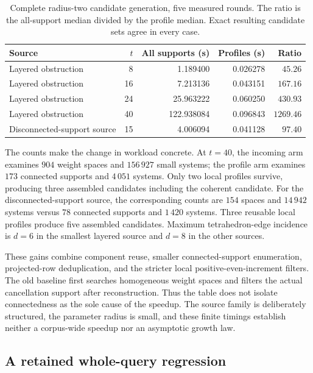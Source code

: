 \begin{table}[htbp]
\centering
\small
\begin{tabular}{lrrrr}
\hline
Source & $t$ & All supports (s) & Profiles (s) & Ratio\\
\hline
Layered obstruction & 8 & 1.189400 & 0.026278 & $45.26$\\
Layered obstruction & 16 & 7.213136 & 0.043151 & $167.16$\\
Layered obstruction & 24 & 25.963222 & 0.060250 & $430.93$\\
Layered obstruction & 40 & 122.938084 & 0.096843 & $1269.46$\\
Disconnected-support source & 15 & 4.006094 & 0.041128 & $97.40$\\
\hline
\end{tabular}
\caption{Complete radius-two candidate generation, five measured
rounds.  The ratio is the all-support median divided by the profile
median.  Exact resulting candidate sets agree in every case.}
\label{tab:profile-radius-two}
\end{table}

The counts make the change in workload concrete.  At $t=40$, the
incoming arm examines $904$ weight spaces and $156\,927$ small systems;
the profile arm examines $173$ connected supports and $4\,051$ systems.
Only two local profiles survive, producing three assembled candidates
including the coherent candidate.  For the disconnected-support source,
the corresponding counts are $154$ spaces and $14\,942$ systems versus
$78$ connected supports and $1\,420$ systems.  Three reusable local
profiles produce five assembled candidates.  Maximum tetrahedron-edge
incidence is $d=6$ in the smallest layered source and $d=8$ in the other
sources.

These gains combine component reuse, smaller connected-support
enumeration, projected-row deduplication, and the stricter local
positive-even-increment filters.  The old baseline first searches
homogeneous weight spaces and filters the actual cancellation support
after reconstruction.  Thus the table does not isolate connectedness
as the sole cause of the speedup.  The source family is deliberately
structured, the parameter radius is small, and these finite timings
establish neither a corpus-wide speedup nor an asymptotic growth law.

\subsection{A retained whole-query regression}

